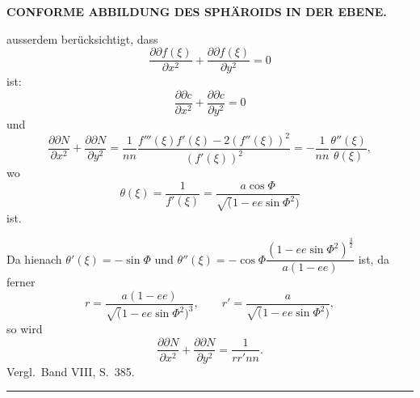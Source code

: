 \par\clearpage
\noindent\null\hfill{\small\textbf{CONFORME ABBILDUNG DES SPHÄROIDS IN DER EBENE.}}\hfill{}\par\medskip

{\small
\noindent ausserdem berücksichtigt, dass
\[
\frac{\partial\partial f(\xi)}{\partial x^2}
+\frac{\partial\partial f(\xi)}{\partial y^2}=0
\]
\noindent ist:
\begin{equation*}
\frac{\partial\partial c}{\partial x^2}
+\frac{\partial\partial c}{\partial y^2}=0
\tag*{6)}
\end{equation*}
\noindent und
\begin{equation*}
\frac{\partial\partial N}{\partial x^2}
+\frac{\partial\partial N}{\partial y^2}
=\frac1{nn}\frac{f'''(\xi)f'(\xi)-2(f''(\xi))^2}{(f'(\xi))^2}
=-\frac1{nn}\frac{\theta''(\xi)}{\theta(\xi)},
\tag*{7)}
\end{equation*}
\noindent wo
\[
\theta(\xi)=\frac1{f'(\xi)}=\frac{a\cos\Phi}{\surd(1-ee\sin\Phi^2)}
\]
\noindent ist.

Da hienach \(\theta'(\xi)=-\sin\Phi\) und
\(\theta''(\xi)=-\cos\Phi\dfrac{(1-ee\sin\Phi^2)^{\frac32}}{a(1-ee)}\) ist, da ferner
\[
r=\frac{a(1-ee)}{\surd(1-ee\sin\Phi^2)^3},\qquad
r'=\frac{a}{\surd(1-ee\sin\Phi^2)},
\]
\noindent so wird
\begin{equation*}
\frac{\partial\partial N}{\partial x^2}
+\frac{\partial\partial N}{\partial y^2}=\frac1{rr'nn}.
\tag*{8)}
\end{equation*}
\noindent Vergl.\ Band VIII, S.\ 385.
\begin{center}\rule{.24\linewidth}{.4pt}\end{center}

}
